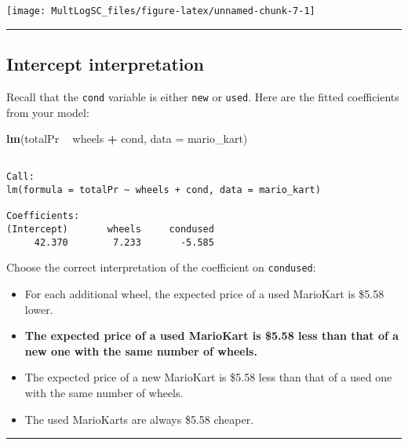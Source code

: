 \documentclass[]{book}
\newenvironment{Shaded}{\begin{snugshade}}{\end{snugshade}}
\newcommand{\KeywordTok}[1]{\textcolor[rgb]{0.13,0.29,0.53}{\textbf{#1}}}
\newcommand{\DataTypeTok}[1]{\textcolor[rgb]{0.13,0.29,0.53}{#1}}
\newcommand{\StringTok}[1]{\textcolor[rgb]{0.31,0.60,0.02}{#1}}
\newcommand{\OperatorTok}[1]{\textcolor[rgb]{0.81,0.36,0.00}{\textbf{#1}}}
\newcommand{\NormalTok}[1]{#1}
\begin{document}
\begin{center}\texttt{[image: MultLogSC\_files/figure-latex/unnamed-chunk-7-1]} \end{center}

\begin{center}\rule{0.5\linewidth}{\linethickness}\end{center}

\subsection*{Intercept interpretation}\label{intercept-interpretation}

Recall that the \texttt{cond} variable is either \texttt{new} or
\texttt{used}. Here are the fitted coefficients from your model:

\begin{Shaded}
\begin{Highlighting}[]
\KeywordTok{lm}\NormalTok{(totalPr }\OperatorTok{~}\StringTok{ }\NormalTok{wheels }\OperatorTok{+}\StringTok{ }\NormalTok{cond, }\DataTypeTok{data =}\NormalTok{ mario_kart)}
\end{Highlighting}
\end{Shaded}

\begin{verbatim}

Call:
lm(formula = totalPr ~ wheels + cond, data = mario_kart)

Coefficients:
(Intercept)       wheels     condused  
     42.370        7.233       -5.585  
\end{verbatim}

Choose the correct interpretation of the coefficient on
\texttt{condused}:

\begin{itemize}
\item
  For each additional wheel, the expected price of a used MarioKart is
  \$5.58 lower.
\item
  \textbf{The expected price of a used MarioKart is \$5.58 less than
  that of a new one with the same number of wheels.}
\item
  The expected price of a new MarioKart is \$5.58 less than that of a
  used one with the same number of wheels.
\item
  The used MarioKarts are always \$5.58 cheaper.
\end{itemize}

\begin{center}\rule{0.5\linewidth}{\linethickness}\end{center}
\end{document}
